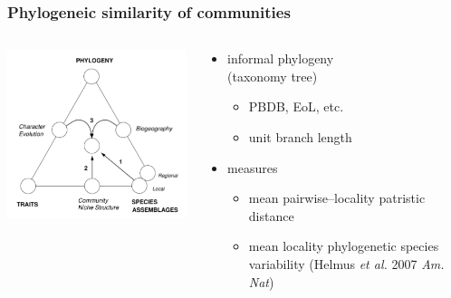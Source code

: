 \documentclass{beamer}
\begin{document}
\begin{frame}
  \frametitle{Phylogeneic similarity of communities}

  \begin{columns}
    \begin{column}{0.5\textwidth}
      \includegraphics[height = 0.8\textheight, width = \textwidth,  keepaspectratio = true]{figure/webb}

      \tiny{}
    \end{column}
    \begin{column}{0.5\textwidth}
      \begin{itemize}
        \item informal phylogeny \\(taxonomy tree)
          \begin{itemize}
            \item PBDB, EoL, etc.
            \item unit branch length
          \end{itemize}
        \item measures
          \begin{itemize}
            \item mean pairwise--locality patristic distance
            \item mean locality phylogenetic species variability (Helmus \textit{et al.} 2007 \textit{Am. Nat})
          \end{itemize}
      \end{itemize}
    \end{column}
  \end{columns}
\end{frame}
\end{document}
